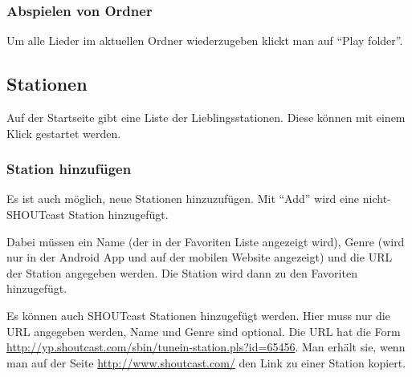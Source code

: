 \documentclass[12pt,a4paper,openany]{memoir}
\begin{document}
\subsubsection{Abspielen von Ordner}
Um alle Lieder im aktuellen Ordner wiederzugeben klickt man auf ``Play folder''. 

\subsection{Stationen}
Auf der Startseite gibt eine Liste der Lieblingsstationen. Diese können mit einem Klick gestartet werden. 

\subsubsection{Station hinzufügen}
Es ist auch möglich, neue Stationen hinzuzufügen. Mit ``Add'' wird eine nicht-SHOUTcast Station hinzugefügt. 


Dabei müssen ein Name (der in der Favoriten Liste angezeigt wird), Genre (wird nur in der Android App und auf der mobilen Website angezeigt) und die URL der Station angegeben werden. 
Die Station wird dann zu den Favoriten hinzugefügt. 

Es können auch SHOUTcast Stationen hinzugefügt werden. Hier muss nur die URL angegeben werden, Name und Genre sind optional. Die URL hat die Form \url{http://yp.shoutcast.com/sbin/tunein-station.pls?id=65456}. 
Man erhält sie, wenn man auf der Seite \url{http://www.shoutcast.com/} den Link zu einer Station kopiert. 
\end{document}
